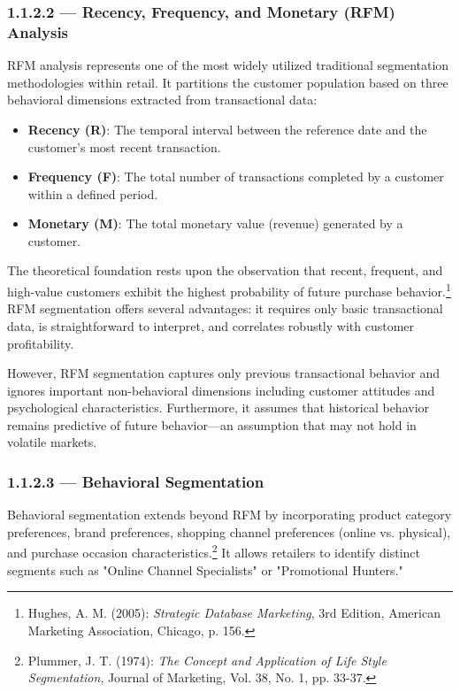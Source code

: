 \documentclass[12pt,a4paper,oneside]{report}
\begin{document}
\subsubsection{1.1.2.2 — Recency, Frequency, and Monetary (RFM) Analysis}

RFM analysis represents one of the most widely utilized traditional segmentation methodologies within retail. It partitions the customer population based on three behavioral dimensions extracted from transactional data:
\begin{itemize}
    \item \textbf{Recency (R)}: The temporal interval between the reference date and the customer's most recent transaction.
    \item \textbf{Frequency (F)}: The total number of transactions completed by a customer within a defined period.
    \item \textbf{Monetary (M)}: The total monetary value (revenue) generated by a customer.
\end{itemize}

The theoretical foundation rests upon the observation that recent, frequent, and high-value customers exhibit the highest probability of future purchase behavior.\footnote{Hughes, A. M. (2005): \textit{Strategic Database Marketing}, 3rd Edition, American Marketing Association, Chicago, p. 156.} RFM segmentation offers several advantages: it requires only basic transactional data, is straightforward to interpret, and correlates robustly with customer profitability.

However, RFM segmentation captures only previous transactional behavior and ignores important non-behavioral dimensions including customer attitudes and psychological characteristics. Furthermore, it assumes that historical behavior remains predictive of future behavior—an assumption that may not hold in volatile markets.

\subsubsection{1.1.2.3 — Behavioral Segmentation}

Behavioral segmentation extends beyond RFM by incorporating product category preferences, brand preferences, shopping channel preferences (online vs. physical), and purchase occasion characteristics.\footnote{Plummer, J. T. (1974): \textit{The Concept and Application of Life Style Segmentation}, Journal of Marketing, Vol. 38, No. 1, pp. 33-37.} It allows retailers to identify distinct segments such as "Online Channel Specialists" or "Promotional Hunters."
\end{document}

